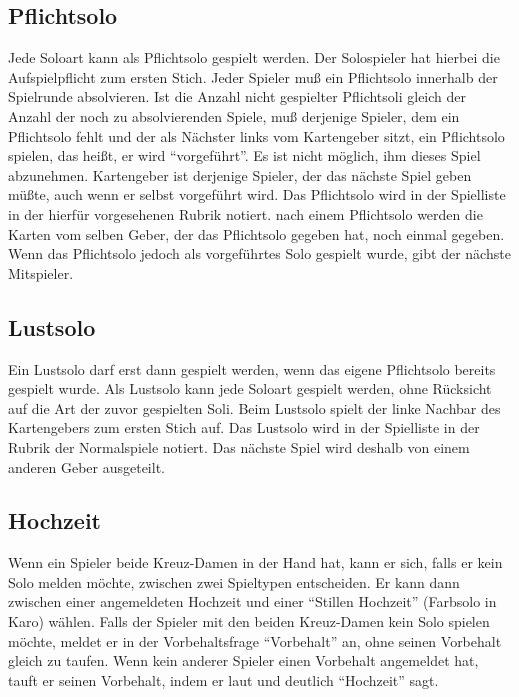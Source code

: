 \documentclass[12pt]{scrartcl}
\begin{document}
\subsection{Pflichtsolo}
Jede Soloart kann als Pflichtsolo gespielt werden. Der
Solospieler hat hierbei die Aufspielpflicht zum ersten Stich.
Jeder Spieler muß ein Pflichtsolo innerhalb der Spielrunde
absolvieren. Ist die Anzahl nicht gespielter Pflichtsoli gleich
der Anzahl der noch zu absolvierenden Spiele, muß derjenige
Spieler, dem ein Pflichtsolo fehlt und der als Nächster links vom
Kartengeber sitzt, ein Pflichtsolo spielen, das heißt, er wird
"`vorgeführt"'. Es ist nicht möglich, ihm dieses Spiel
abzunehmen. Kartengeber ist derjenige Spieler, der das nächste
Spiel geben müßte, auch wenn er selbst vorgeführt wird. Das
Pflichtsolo wird in der Spielliste in der hierfür vorgesehenen
Rubrik notiert. nach einem Pflichtsolo werden die Karten vom
selben Geber, der das Pflichtsolo gegeben hat, noch einmal
gegeben. Wenn das Pflichtsolo jedoch als vorgeführtes Solo
gespielt wurde, gibt der nächste Mitspieler.

\subsection{Lustsolo}
Ein Lustsolo darf erst dann gespielt werden, wenn das eigene
Pflichtsolo bereits gespielt wurde. Als Lustsolo kann jede
Soloart gespielt werden, ohne Rücksicht auf die Art der zuvor
gespielten Soli. Beim Lustsolo spielt der linke Nachbar des
Kartengebers zum ersten Stich auf. Das Lustsolo wird in der
Spielliste in der Rubrik der Normalspiele notiert. Das nächste
Spiel wird deshalb von einem anderen Geber ausgeteilt.

\subsection{Hochzeit}
Wenn ein Spieler beide Kreuz-Damen in der Hand hat, kann er sich,
falls er kein Solo melden möchte, zwischen zwei Spieltypen
entscheiden. Er kann dann zwischen einer angemeldeten Hochzeit
und einer "`Stillen Hochzeit"' (Farbsolo in Karo) wählen. Falls
der Spieler mit den beiden Kreuz-Damen kein Solo spielen möchte,
meldet er in der Vorbehaltsfrage "`Vorbehalt"' an, ohne seinen
Vorbehalt gleich zu taufen. Wenn kein anderer Spieler einen
Vorbehalt angemeldet hat, tauft er seinen Vorbehalt, indem er laut
und deutlich "`Hochzeit"' sagt.
\end{document}
